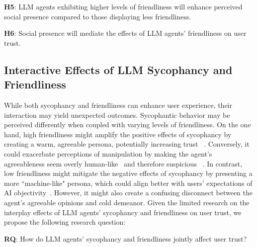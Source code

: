 \vspace{2pt}
\textbf{H5}: LLM agents exhibiting higher levels of friendliness will enhance perceived social presence compared to those displaying less friendliness.

\vspace{2pt}
\textbf{H6}: Social presence will mediate the effects of LLM agents' friendliness on user trust. 

\subsection{Interactive Effects of LLM Sycophancy and Friendliness}
While both sycophancy and friendliness can enhance user experience, their interaction may yield unexpected outcomes. Sycophantic behavior  may be perceived differently when coupled with varying levels of friendliness. On the one hand, high friendliness might amplify the positive effects of sycophancy by creating a warm, agreeable persona, potentially increasing trust ~\cite{zabel2021bias}. Conversely, it could exacerbate perceptions of manipulation by making the agent's agreeableness seem overly human-like~\cite{mori2012uncanny,ciechanowski2019uncanny} and therefore suspicious ~\cite{alberts2024badsocialactors}. In contrast, low friendliness might mitigate the negative effects of sycophancy by presenting a more ``machine-like" persona, which could align better with users' expectations of AI objectivity~\cite{sundar2019machine}. However, it might also create a confusing disconnect between the agent's agreeable opinions and cold demeanor. Given the limited research on the interplay effects of LLM agents' sycophancy and friendliness on user trust, we propose the following research question: 

\vspace{2pt}
\textbf{RQ}: How do LLM agents' sycophancy and friendliness jointly affect user trust? 
